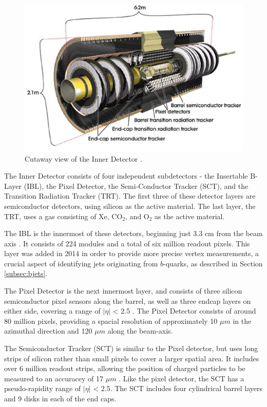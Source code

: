 \begin{figure}[H]
\centering
   \includegraphics[width=0.75\linewidth]{figures/lhc/InnerDetector.eps}
\caption{Cutaway view of the Inner Detector \cite{caloFig}.}
\label{fig:innerDect}
\end{figure}

The Inner Detector consists of four independent subdetectors - the Insertable B-Layer (IBL), the Pixel Detector, the Semi-Conductor Tracker (SCT), and the Transition Radiation Tracker (TRT). The first three of these detector layers are semiconductor detectors, using silicon as the active material. The last layer, the TRT, uses a gas consisting of Xe, CO$_2$, and O$_2$ as the active material.

The IBL is the innermost of these detectors, beginning just 3.3 cm from the beam axis \cite{larosa2016atlas}. It consists of 224 modules and a total of six million readout pixels. This layer was added in 2014 in order to provide more precise vertex measurements, a crucial aspect of identifying jets originating from $b$-quarks, as described in Section \ref{subsec:bjets}. 

The Pixel Detector is the next innermost layer, and consists of three silicon semiconductor pixel sensors along the barrel, as well as three endcap layers on either side, covering a range of $|\eta|$ < 2.5 \cite{PERF-2012-05}. The Pixel Detector consists of around 80 million pixels, providing a spacial resolution of approximately 10 $\mu m$ in the azimuthal direction and 120 $\mu m$ along the beam-axis. 

The Semiconductor Tracker (SCT) is similar to the Pixel detector, but uses long strips of silicon rather than small pixels to cover a larger spatial area. It includes over 6 million readout strips, allowing the position of charged particles to be measured to an accuracey of 17 $\mu m$ \cite{IDET-2013-01}. Like the pixel detector, the SCT has a pseudo-rapidity range of $|\eta|$ < 2.5. The SCT includes four cylindrical barrel layers and 9 disks in each of the end caps.

